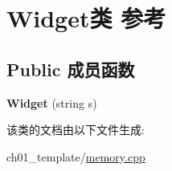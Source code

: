 \hypertarget{class_widget}{}\section{Widget类 参考}
\label{class_widget}
\subsection*{Public 成员函数}
\begin{DoxyCompactItemize}
\item 
\mbox{\label{class_widget_a04bf23f571869f6f557ccf2580eb4f64}} 
{\bfseries Widget} (string s)
\end{DoxyCompactItemize}


该类的文档由以下文件生成\+:\begin{DoxyCompactItemize}
\item 
ch01\+\_\+template/\mbox{\hyperlink{memory_8cpp}{memory.\+cpp}}\end{DoxyCompactItemize}
